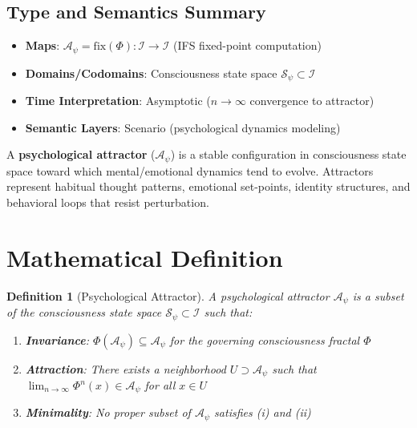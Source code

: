 \documentclass[11pt,twoside]{book}
\newcommand{\Ideas}{\mathcal{I}}
\newcommand{\Frac}{\Phi}
\newcommand{\fix}{\mathrm{fix}}
\newcommand{\PsychAttractor}{\mathcal{A}_\psi}
\newtheorem{definition}{Definition}[chapter]
\begin{document}
\subsection*{Type and Semantics Summary}
\begin{itemize}
    \item \textbf{Maps}: $\PsychAttractor = \fix(\Frac) : \Ideas \to \Ideas$ (IFS fixed-point computation)
    \item \textbf{Domains/Codomains}: Consciousness state space $\mathcal{S}_\psi \subset \Ideas$
    \item \textbf{Time Interpretation}: Asymptotic ($n \to \infty$ convergence to attractor)
    \item \textbf{Semantic Layers}: Scenario (psychological dynamics modeling)
\end{itemize}

\begin{tcolorbox}[colback=purple!5!white,colframe=purple!75!black,title=\textbf{Definition: Psychological Attractor},breakable]
A \textbf{psychological attractor} ($\PsychAttractor$) is a stable configuration in
consciousness state space toward which mental/emotional dynamics tend to evolve.
Attractors represent habitual thought patterns, emotional set-points, identity structures,
and behavioral loops that resist perturbation.
\end{tcolorbox}

\section{Mathematical Definition}

\begin{definition}[Psychological Attractor]
\label{def:psych-attractor}
A \emph{psychological attractor} $\PsychAttractor$ is a subset of the consciousness
state space $\mathcal{S}_\psi \subset \Ideas$ such that:
\begin{enumerate}[label=(\roman*)]
    \item \textbf{Invariance}: $\Frac(\PsychAttractor) \subseteq \PsychAttractor$ for
          the governing consciousness fractal $\Frac$
    \item \textbf{Attraction}: There exists a neighborhood $U \supset \PsychAttractor$
          such that $\lim_{n \to \infty} \Frac^n(x) \in \PsychAttractor$ for all $x \in U$
    \item \textbf{Minimality}: No proper subset of $\PsychAttractor$ satisfies (i) and (ii)
\end{enumerate}
\end{definition}
\end{document}
